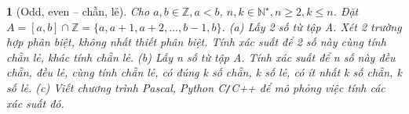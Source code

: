 \documentclass{article}
\newtheorem{baitoan}{}
\begin{document}
\begin{baitoan}[Odd, even -- chẵn, lẻ]
	Cho $a,b\in\mathbb{Z},a < b$, $n,k\in\mathbb{N}^\star,n\ge2,k\le n$. Đặt $A = [a,b]\cap\mathbb{Z} = \{a,a + 1,a + 2,\ldots,b - 1,b\}$. (a) Lấy 2 số từ tập A. Xét 2 trường hợp phân biệt, không nhất thiết phân biệt. Tính xác suất để 2 số này cùng tính chẵn lẻ, khác tính chẵn lẻ. (b) Lấy n số từ tập A. Tính xác suất để n số này đều chẵn, đều lẻ, cùng tính chẵn lẻ, có đúng k số chẵn, k số lẻ, có ít nhất k số chẵn, k số lẻ. (c) Viết chương trình {\sf Pascal, Python C{\tt/}C++} để mô phỏng việc tính các xác suất đó.
\end{baitoan}


\printbibliography[heading=bibintoc]
	
\end{document}

